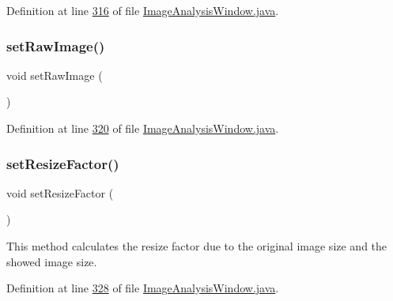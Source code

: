 Definition at line \hyperlink{_image_analysis_window_8java_source_l00316}{316} of file \hyperlink{_image_analysis_window_8java_source}{Image\+Analysis\+Window.\+java}.

\hypertarget{classgui_1_1_image_analysis_window_a612d8bbeb78a27050cf59d9db734fc11}{}\label{classgui_1_1_image_analysis_window_a612d8bbeb78a27050cf59d9db734fc11} 
\subsubsection{\texorpdfstring{set\+Raw\+Image()}{setRawImage()}}
{\footnotesize\ttfamily void set\+Raw\+Image (\begin{DoxyParamCaption}{ }\end{DoxyParamCaption})}



Definition at line \hyperlink{_image_analysis_window_8java_source_l00320}{320} of file \hyperlink{_image_analysis_window_8java_source}{Image\+Analysis\+Window.\+java}.

\hypertarget{classgui_1_1_image_analysis_window_aa8880ccb12f2638822de16dd50e9c6d1}{}\label{classgui_1_1_image_analysis_window_aa8880ccb12f2638822de16dd50e9c6d1} 
\subsubsection{\texorpdfstring{set\+Resize\+Factor()}{setResizeFactor()}}
{\footnotesize\ttfamily void set\+Resize\+Factor (\begin{DoxyParamCaption}{ }\end{DoxyParamCaption})}

This method calculates the resize factor due to the original image size and the showed image size. 

Definition at line \hyperlink{_image_analysis_window_8java_source_l00328}{328} of file \hyperlink{_image_analysis_window_8java_source}{Image\+Analysis\+Window.\+java}.

\hypertarget{classgui_1_1_image_analysis_window_ae40d46c96e8374f03e40ce6ef6287d5d}{}\label{classgui_1_1_image_analysis_window_ae40d46c96e8374f03e40ce6ef6287d5d} 
